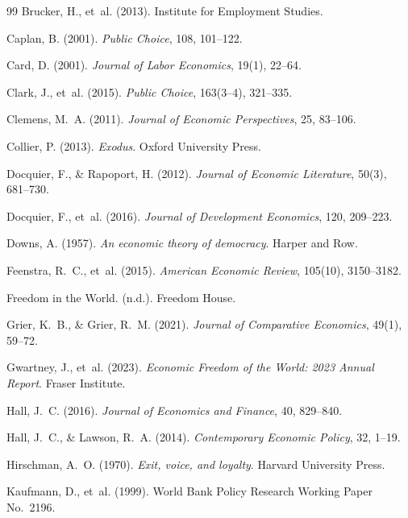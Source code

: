 \documentclass[12pt]{article}
\begin{document}
\begin{thebibliography}{99}
Brucker, H., et~al. (2013). Institute for Employment Studies.

Caplan, B. (2001). \textit{Public Choice}, 108, 101--122.

Card, D. (2001). \textit{Journal of Labor Economics}, 19(1), 22--64.

Clark, J., et~al. (2015). \textit{Public Choice}, 163(3--4), 321--335.

Clemens, M.~A. (2011). \textit{Journal of Economic Perspectives}, 25, 83--106.

Collier, P. (2013). \textit{Exodus}. Oxford University Press.

Docquier, F., \& Rapoport, H. (2012). \textit{Journal of Economic Literature}, 50(3), 681--730.

Docquier, F., et~al. (2016). \textit{Journal of Development Economics}, 120, 209--223.

Downs, A. (1957). \textit{An economic theory of democracy}. Harper and Row.

Feenstra, R.~C., et~al. (2015). \textit{American Economic Review}, 105(10), 3150--3182.

Freedom in the World. (n.d.). Freedom House.

Grier, K.~B., \& Grier, R.~M. (2021). \textit{Journal of Comparative Economics}, 49(1), 59--72.

Gwartney, J., et~al. (2023). \textit{Economic Freedom of the World: 2023 Annual Report}. Fraser Institute.

Hall, J.~C. (2016). \textit{Journal of Economics and Finance}, 40, 829--840.

Hall, J.~C., \& Lawson, R.~A. (2014). \textit{Contemporary Economic Policy}, 32, 1--19.

Hirschman, A.~O. (1970). \textit{Exit, voice, and loyalty}. Harvard University Press.

Kaufmann, D., et~al. (1999). World Bank Policy Research Working Paper No.\ 2196.


\end{thebibliography}
\end{document}

